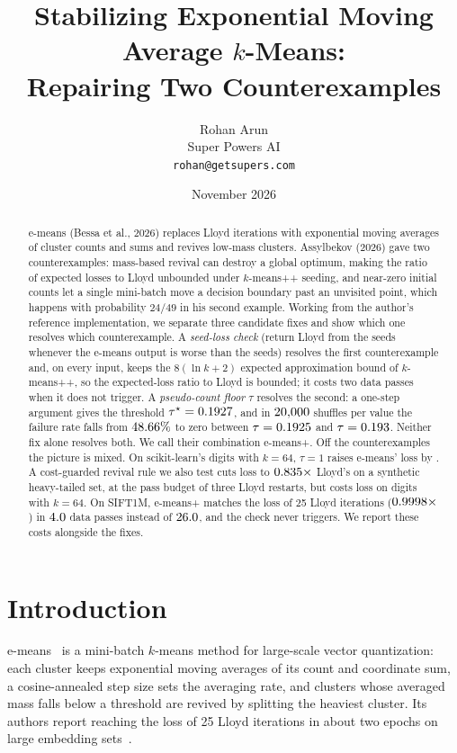 \documentclass[11pt]{article}
\title{\textbf{Stabilizing Exponential Moving Average $k$-Means:\\ Repairing Two Counterexamples}}
\author{Rohan Arun\\ Super Powers AI\\ \texttt{rohan@getsupers.com}}
\date{November 2026}
\theoremstyle{remark}
\begin{document}
\maketitle

\begin{abstract}
e-means (Bessa et al., 2026) replaces Lloyd iterations with exponential moving averages of
cluster counts and sums and revives low-mass clusters. Assylbekov (2026) gave two
counterexamples: mass-based revival can destroy a global optimum, making the ratio of expected
losses to Lloyd unbounded under $k$-means++ seeding, and near-zero initial counts let a single
mini-batch move a decision boundary past an unvisited point, which happens with probability
$24/49$ in his second example. Working from the author's reference implementation, we separate
three candidate fixes and show which one resolves which counterexample. A \emph{seed-loss check}
(return Lloyd from the seeds whenever the e-means output is worse than the seeds) resolves the
first counterexample and, on every input, keeps the $8(\ln k+2)$ expected approximation bound of
$k$-means++, so the expected-loss ratio to Lloyd is bounded; it costs two data passes when it does
not trigger. A \emph{pseudo-count floor} $\tau$ resolves the second: a one-step argument gives the
threshold $\tau^\star=0.1927$, and in $20{,}000$ shuffles per value the failure rate falls from
$48.66\%$ to zero between $\tau=0.1925$ and $\tau=0.193$. Neither fix alone
resolves both. We call their combination e-means+. Off the counterexamples the picture is mixed.
On scikit-learn's digits with $k{=}64$, $\tau=1$ raises e-means' loss by \tauCostOne{}. A
cost-guarded revival rule we also test cuts loss to $0.835\times$ Lloyd's on a synthetic
heavy-tailed set, at the pass budget of three Lloyd restarts, but costs loss on digits with $k{=}64$. On SIFT1M, e-means+ matches the loss of 25 Lloyd iterations
($0.9998\times$) in $4.0$ data passes instead of $26.0$, and the check never triggers.
We report these costs alongside the fixes.
\end{abstract}

\section{Introduction}

e-means~\cite{bessa2026} is a mini-batch $k$-means method for large-scale vector quantization:
each cluster keeps exponential moving averages of its count and coordinate sum, a cosine-annealed
step size sets the averaging rate, and clusters whose averaged mass falls below a threshold are
revived by splitting the heaviest cluster. Its authors report reaching the loss of 25 Lloyd
iterations in about two epochs on large embedding sets~\cite{bessa2026}.
\end{document}

